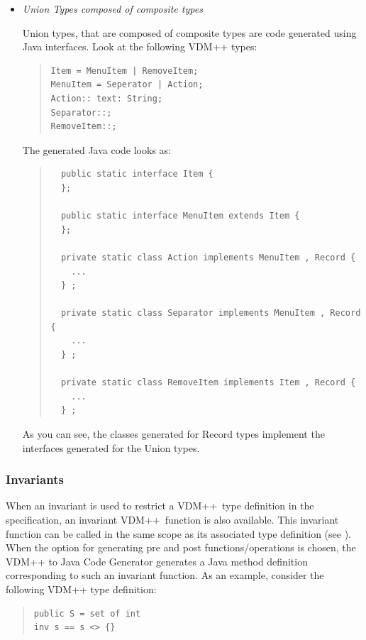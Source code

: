 \documentclass[\pformat,11pt]{article}
\newcommand{\langmancite}{\cite{LangManPP-SCSK}}
\newcommand{\VDM}{VDM++}
\newcommand{\cg}{VDM++ to Java Code Generator}
\begin{document}
\begin{itemize}
\item {\em Union Types composed of composite types}

Union types, that are composed of composite types are code generated using Java interfaces. Look at the following VDM++ types:

\begin{quote}
\begin{verbatim}
Item = MenuItem | RemoveItem;
MenuItem = Seperator | Action;
Action:: text: String;
Separator::;
RemoveItem::;
\end{verbatim}
\end{quote}

The generated Java code looks as:

\begin{quote}
\begin{small}  
\begin{verbatim}
  public static interface Item {
  };

  public static interface MenuItem extends Item {
  };

  private static class Action implements MenuItem , Record {
    ...
  } ;

  private static class Separator implements MenuItem , Record {
    ...
  } ;

  private static class RemoveItem implements Item , Record {
    ...
  } ;
\end{verbatim}
\end{small}  
\end{quote}

As you can see, the classes generated for Record types implement the interfaces generated for the Union types.
\end{itemize}

\subsubsection{Invariants }

When an invariant is used to restrict a \VDM\ type definition in the
specification, an invariant \VDM\ function is also available. This
invariant function can be called in the same scope as its associated
type definition (see \langmancite). When the option for generating pre
and post functions/operations is
chosen, the \cg{} generates a Java method definition corresponding to
such an invariant function. As an
example, consider the following \VDM{} type definition:

\begin{quote}
\begin{verbatim}
public S = set of int
inv s == s <> {}
\end{verbatim}
\end{quote}
\end{document}
